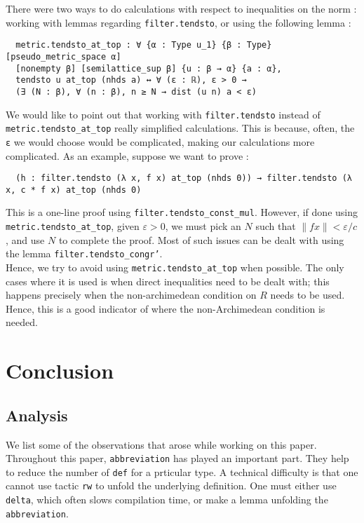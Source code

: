 \documentclass[11pt]{article}
\newcommand{\lean}[1]{\texttt{#1}\xspace} %
\begin{document}
There were two ways to do calculations with respect to inequalities on the norm : working with lemmas regarding \lean{filter.tendsto}, 
or using the following lemma : 
\begin{lstlisting}
  metric.tendsto_at_top : ∀ {α : Type u_1} {β : Type} [pseudo_metric_space α] 
  [nonempty β] [semilattice_sup β] {u : β → α} {a : α}, 
  tendsto u at_top (nhds a) ↔ ∀ (ε : ℝ), ε > 0 → 
  (∃ (N : β), ∀ (n : β), n ≥ N → dist (u n) a < ε)
\end{lstlisting}
We would like to point out that working with \lean{filter.tendsto} instead of \lean{metric.tendsto\_at\_top} really simplified 
calculations. This is because, often, the \lean{ε} we would choose would be complicated, making our calculations more 
complicated. As an example, suppose we want to prove :
\begin{lstlisting}
  (h : filter.tendsto (λ x, f x) at_top (nhds 0)) → filter.tendsto (λ x, c * f x) at_top (nhds 0)
\end{lstlisting}
This is a one-line proof using \lean{filter.tendsto\_const\_mul}. However, if done using \lean{metric.tendsto\_at\_top}, 
given $\varepsilon > 0$, we must pick an $N$ such that $\lVert f x \rVert < \varepsilon / c$, and use $N$ to complete the proof. 
Most of such issues can be dealt with using the lemma \lean{filter.tendsto\_congr'}. \\

Hence, we try to avoid using \lean{metric.tendsto\_at\_top} when possible. The only cases where it is used is when direct inequalities 
need to be dealt with; this happens precisely when the non-archimedean condition on $R$ needs to be used. Hence, this is a good 
indicator of where the non-Archimedean condition is needed.

\section{Conclusion}
\subsection{Analysis}
We list some of the observations that arose while working on this paper. \\
Throughout this paper, \lean{abbreviation} has played an important part. They help to reduce the number of \lean{def} for a prticular type. A technical 
difficulty is that one cannot use tactic \lean{rw} to unfold the underlying definition. One must either use \lean{delta}, which often slows compilation 
time, or make a lemma unfolding the \lean{abbreviation}. \\ 
\end{document}
